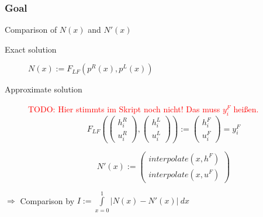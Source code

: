 \documentclass{beamer}
\newcommand{\todo}[1]{\textcolor{red}{TODO: #1}}
\begin{document}
\begin{frame}
  \frametitle{Goal}
  \begin{block}{Comparison of $N(x)$ and $N'(x)$}
    \begin{description}
    \item[Exact solution] $N(x) := F_{LF}(p^R(x),p^L(x))$
    \item[Approximate solution] \todo{Hier stimmts im Skript noch nicht! Das muss $y_i^F$ heißen.}
      \begin{equation*}
        F_{LF}\left(
          \begin{pmatrix}
            h_i^R \\ u_i^R
          \end{pmatrix},
          \begin{pmatrix}
            h_i^L \\ u_i^L
          \end{pmatrix}
        \right) :=
        \begin{pmatrix}
          h_i^F \\ u_i^F
        \end{pmatrix} = y_i^F
      \end{equation*}

      \begin{equation*}
        N'(x) :=
        \begin{pmatrix}
          interpolate(x,h^F) \\ interpolate(x,u^F)
        \end{pmatrix}
      \end{equation*}
    \end{description}
  \end{block}
  $\Rightarrow$ Comparison by 
  $I := \int\limits_{x=0}^1 | N(x) - N'(x) |\  dx$

\end{frame}
\end{document}
